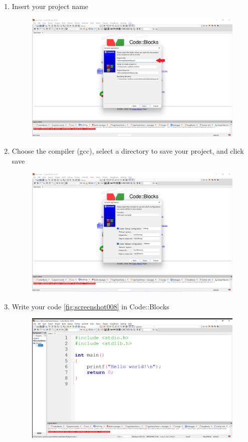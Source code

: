 \begin{enumerate}
\begin{figure}[H]
		      \caption{}
		      \label{fig:screenshot005}
	      \end{figure}
	\item Insert your project name
	      \begin{figure}[H]
		      \centering
		      \includegraphics[width=0.7\linewidth]{P1/img/screenshot006.png}
		      \caption{}
		      \label{fig:screenshot006}
	      \end{figure}
	\item Choose the compiler (gcc), select a directory to save your project, and click save
	      \begin{figure}[H]
		      \centering
		      \includegraphics[width=0.7\linewidth]{P1/img/screenshot007.png}
		      \caption{}
		      \label{fig:screenshot007}
	      \end{figure}
	\item Write your code \ref{fig:screenshot008} in Code::Blocks
	      \begin{figure}[H]
		      \centering
		      \includegraphics[width=0.7\linewidth]{P1/img/screenshot008.png}

\end{figure}
\end{enumerate}
